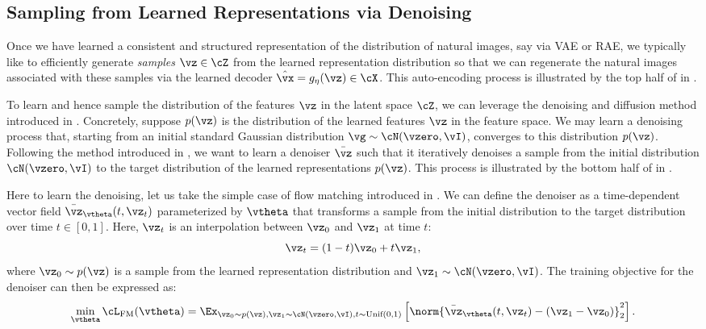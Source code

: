 \documentclass[../../book-main.tex]{subfiles}
\begin{document}
\subsection{Sampling from Learned Representations via Denoising}

Once we have learned a consistent and structured representation of the distribution of natural images, say via VAE or
RAE, we typically like to efficiently generate \textit{samples} \(\vz \in \cZ\) from the learned representation distribution so that we can regenerate the natural images associated with these samples via the learned decoder \(\hat{\vx} = g_{\eta}(\vz) \in \cX\).
This auto-encoding process is illustrated by the top half of  in .

To learn and hence sample the distribution of the features \(\vz\) in the latent space \(\cZ\), we can leverage the denoising and diffusion method introduced in .
Concretely, suppose \(p(\vz)\) is the distribution of the learned features \(\vz\) in the feature space.
We may learn a denoising process that, starting from an initial standard Gaussian distribution \(\vg \sim \cN(\vzero, \vI)\), converges to this distribution \(p(\vz)\).
Following the method introduced in , we want to learn a denoiser \(\bar{\vz}\) such that it iteratively
denoises a sample from the initial distribution \(\cN(\vzero, \vI)\) to the target distribution of the learned representations \(p(\vz)\).
This process is illustrated by the bottom half of  in .

Here to learn the denoising, let us take the simple case of flow matching introduced in .
We can define the denoiser as a time-dependent vector field \(\bar{\vz}_{\vtheta}(t, \vz_t)\) parameterized by \(\vtheta\) that transforms a sample from the
initial distribution to the target distribution over time \(t \in [0, 1]\).
Here, \(\vz_t\) is an interpolation between \(\vz_0\) and \(\vz_1\) at time \(t\):
\begin{equation}
\vz_t = (1 - t)\vz_0 + t\vz_1 ,
\end{equation}
where \(\vz_0 \sim p(\vz)\) is a sample from the learned representation
distribution and \(\vz_1 \sim \cN(\vzero, \vI)\).
The training objective for the denoiser can then be expressed as:
\begin{equation}
\min_{\vtheta} \cL_{\text{FM}}(\vtheta) = \Ex_{\vz_0 \sim p(\vz), \vz_1
\sim \cN(\vzero, \vI), t \sim \text{Unif}(0, 1)} \left[
\norm{\bar{\vz}_{\vtheta}(t,\vz_t) - (\vz_1 - \vz_0)}_2^2 \right] .
\end{equation}
\end{document}

